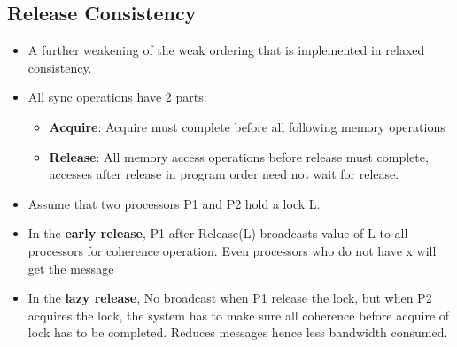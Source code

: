 \documentclass{article}
\begin{document}
\subsection{Release Consistency}
\begin{itemize}
    \item A further weakening of the weak ordering that is implemented in relaxed consistency. 
    
    \item All sync operations have 2 parts:
    \begin{itemize}
        \item \textbf{Acquire}: Acquire must complete before all following memory operations
        
        \item \textbf{Release}: All memory access operations before release must complete, accesses after release in program order need not wait for release.
    \end{itemize}
    
    \item Assume that two processors P1 and P2 hold a lock L. 
    
    \item In the \textbf{early release}, P1 after Release(L) broadcasts value of L to all processors for coherence operation. Even processors who do not have x will get the message
    
    \item In the \textbf{lazy release}, No broadcast when P1 release the lock, but when P2 acquires the lock, the system has to make sure all coherence before acquire of lock has to be completed. Reduces messages hence less bandwidth consumed.
\end{itemize}
\end{document}
